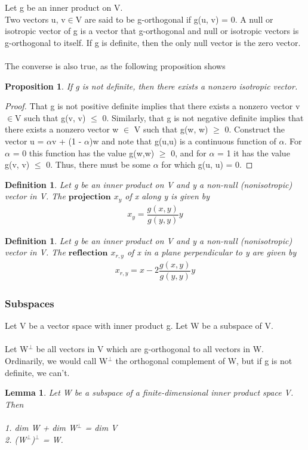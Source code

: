 \documentclass[12pt,a4paper]{article}
\newtheorem{lem}[thm]{Lemma}
\newtheorem{defn}[thm]{Definition}
\newtheorem{prop}{Proposition}
\begin{document}
Let g be an inner product on V. \\
Two vectors u, v$\in$V are said to be
g-orthogonal if g(u, v) = 0. A null or isotropic vector of g is a vector that
g-orthogonal and null or
isotropic vectors
is g-orthogonal to itself. If g is definite, then the only null vector is the zero
vector. \\\\The converse is also true, as the following proposition shows

\begin{prop}
If g is not definite, then there exists a nonzero
isotropic vector.
\end{prop}
\begin{proof}
That g is not positive definite implies that there exists a nonzero vector v$\in$V such that g(v, v) $\leq$ 0. Similarly, that g is not negative definite
implies that there exists a nonzero vector w $\in$ V such that g(w, w) $\geq$ 0. Construct the vector u = $\alpha$v + (1 - $\alpha$)w and note that g(u,u) is a continuous function of $\alpha$. For $\alpha$ = 0 this function has the value g(w,w) $\geq$ 0, and for $\alpha$ = 1 it has the value g(v, v) $\leq$ 0. Thus, there must be some $\alpha$ for which g(u, u) = 0.
\end{proof}
\begin{defn}
Let g be an inner product on V and y a non-null (nonisotropic) vector in V. The $\textbf{projection}$ $x_y$ of x along y is given by 
\begin{eqnarray*}
x_y = \dfrac{g(x,y)}{g(y,y)} y
\end{eqnarray*}
\end{defn}
\begin{defn}
Let g be an inner product on V and y a non-null (nonisotropic) vector in V. The $\textbf{reflection}$ $x_{r,y}$ of x in a plane perpendicular to y are given by 
\begin{eqnarray*}
x_{r,y} = x - 2 \dfrac{g(x,y)}{g(y,y)} y
\end{eqnarray*}
\end{defn}

\subsubsection{Subspaces}
Let V be a vector space with inner product g. Let W be a subspace of V.\\\\
Let W$^\perp$ be all vectors in V which are g-orthogonal to all vectors in W.
Ordinarily, we would call W$^\perp$ the orthogonal complement of W, but if g
is not definite, we can’t.
\begin{lem}
Let W be a subspace of a finite-dimensional inner product
space V. Then\\\\
1. dim W + dim W$^\perp$ = dim V\\
2. (W$^\perp$)$^\perp$ = W.
\end{lem}
\end{document}
